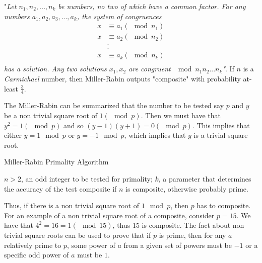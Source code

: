 \documentclass[12pt,journal,compsoc]{IEEEtran}
\begin{document}
"\emph{Let $n_1, n_2,...,n_k$ be numbers, no two of which have a common factor. For any numbers $a_1, a_2, a_3,...,a_k$, the system of congruences }
\begin{align*}
x &\equiv a_1 (\mod n_1) \\
x &\equiv a_2 (\mod n_2) \\
&.\\
&.\\
x &\equiv a_k (\mod n_k) \\
\end{align*}
\emph{has a solution. Any two solutions $x_1, x_2$ are congruent $\mod n_1 n_2 ... n_k$"}. If $n$ is a \emph{Carmichael} number, then Miller-Rabin outputs "composite" with probability at-least $\frac{3}{4}$. %


The Miller-Rabin can be summarized that the number to be tested say $p$ and $y$ be a non trivial square root of $1 (\mod p)$.\cite{miller-rabin} Then we must have that $y^{2} = 1 (\mod p)$ and so $(y-1)(y+1) = 0(\mod p)$. This implies that either $y = 1 \mod p$ or $y = -1 \mod p$, which implies that $y$ is a trivial square root.


\begin{algorithm}                      %
\caption{Miller-Rabin Primality Algorithm}          %
\label{alg1}                           %
\begin{algorithmic}                    %
    \REQUIRE $n>2$, an odd integer to be tested for primality; $k$, a parameter that determines the accuracy of the test
    \ENSURE composite if $n$ is composite, otherwise probably prime.
    
   
   \REPEAT
	\ENDIF
		\ENDIF
		\ENDIF
	\ENDFOR
\end{algorithmic}
\end{algorithm}

Thus, if there is a non trivial square root of $1 \mod p$, then $p$ has to composite. For an example of a non trivial square root of a composite, consider $p = 15$. We have that $4^{2} = 16 = 1 (\mod 15)$, thus 15 is composite. The fact about non trivial square roots can be used to prove that if $p$ is prime, then for any $a$ relatively prime to $p$, some power of $a$ from a given set of powers must be $-1$ or a specific odd power of $a$ must be $1$.
\end{document}

